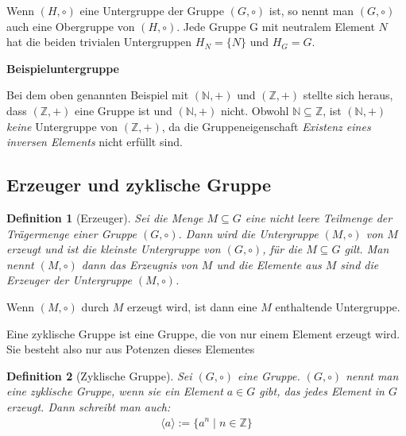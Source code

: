 \documentclass[12pt,a4paper, usenames, dvipsnames]{article}
\newtheorem{definition}{Definition}
\begin{document}
Wenn $(H, \circ)$ eine Untergruppe der Gruppe $(G, \circ)$ ist, so nennt man $(G, \circ)$ auch eine Obergruppe von $(H, \circ)$.
Jede Gruppe G mit neutralem Element $N$ hat die beiden trivialen Untergruppen ${H_N = \{N\}}$ und $H_G=G$.


\textbf{Beispieluntergruppe}

Bei dem oben genannten Beispiel mit $(\mathbb{N},+)$ und $(\mathbb{Z},+)$ stellte sich heraus, dass $(\mathbb{Z},+)$ eine Gruppe ist und $(\mathbb{N},+)$ nicht. Obwohl $\mathbb{N \subseteq \mathbb{Z}}$, ist $(\mathbb{N},+)$ \textit{keine} Untergruppe von $(\mathbb{Z},+)$, da die Gruppeneigenschaft \textit{Existenz eines inversen Elements} nicht erfüllt sind.
%
%
%
%
%
%
%
%
%
%

\subsection*{Erzeuger und zyklische Gruppe} 


\begin{singlespacing}
\begin{definition}[Erzeuger]
Sei die Menge $M \subseteq G$ eine nicht leere Teilmenge der Trägermenge einer Gruppe $(G, \circ)$. 
Dann wird die Untergruppe $(M, \circ)$ von $M$ erzeugt und ist die kleinste Untergruppe von $(G, \circ)$, für die $M \subseteq G$ gilt.
Man nennt $(M, \circ)$ dann das Erzeugnis von $M$ und die Elemente aus $M$ sind die Erzeuger der Untergruppe $(M, \circ)$.
\end{definition}
\end{singlespacing}
Wenn $(M, \circ)$ durch $M$ erzeugt wird, ist dann eine $M$ enthaltende Untergruppe.

Eine zyklische Gruppe ist eine Gruppe, die von nur einem Element erzeugt wird. Sie besteht also nur aus Potenzen dieses Elementes
\begin{singlespacing}
\begin{definition}[Zyklische Gruppe]
Sei $(G, \circ)$ eine Gruppe. $(G, \circ)$ nennt man eine zyklische Gruppe, wenn sie ein Element $a \in G$ gibt, das jedes Element in $G$ erzeugt. Dann schreibt man auch:
\begin{align*}
\langle a \rangle := \{ a^n \mid n \in \mathbb{Z} \}
\end{align*}

\end{definition}
\end{singlespacing}
\end{document}
